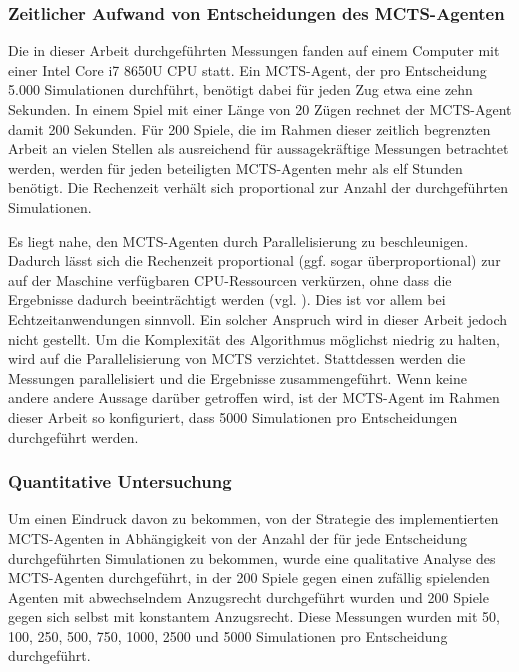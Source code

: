 \subsubsection{Zeitlicher Aufwand von Entscheidungen des MCTS-Agenten}

Die in dieser Arbeit durchgeführten Messungen fanden auf einem Computer mit einer Intel Core i7 8650U CPU statt. Ein MCTS-Agent, der pro Entscheidung 5.000 Simulationen durchführt, benötigt dabei für jeden Zug etwa eine zehn Sekunden. In einem Spiel mit einer Länge von 20 Zügen rechnet der MCTS-Agent damit 200 Sekunden. Für 200 Spiele, die im Rahmen dieser zeitlich begrenzten Arbeit an vielen Stellen als ausreichend für aussagekräftige Messungen betrachtet werden, werden für jeden beteiligten MCTS-Agenten mehr als elf Stunden benötigt. Die Rechenzeit verhält sich proportional zur Anzahl der durchgeführten Simulationen.

Es liegt nahe, den MCTS-Agenten durch Parallelisierung zu beschleunigen. Dadurch lässt sich die Rechenzeit proportional (ggf. sogar überproportional) zur auf der Maschine verfügbaren CPU-Ressourcen verkürzen, ohne dass die Ergebnisse dadurch beeinträchtigt werden (vgl. \cite{Chaslot.2008}). Dies ist vor allem bei Echtzeitanwendungen sinnvoll. Ein solcher Anspruch wird in dieser Arbeit jedoch nicht gestellt. Um die Komplexität des Algorithmus möglichst niedrig zu halten, wird auf die Parallelisierung von MCTS verzichtet. Stattdessen werden die Messungen parallelisiert und die Ergebnisse zusammengeführt. Wenn keine andere andere Aussage darüber getroffen wird, ist der MCTS-Agent im Rahmen dieser Arbeit so konfiguriert, dass 5000 Simulationen pro Entscheidungen durchgeführt werden.

\subsubsection{Quantitative Untersuchung}

Um einen Eindruck davon zu bekommen, von der Strategie des implementierten MCTS-Agenten in Abhängigkeit von der Anzahl der für jede Entscheidung durchgeführten Simulationen zu bekommen, wurde eine qualitative Analyse des MCTS-Agenten durchgeführt, in der 200 Spiele gegen einen zufällig spielenden Agenten mit abwechselndem Anzugsrecht durchgeführt wurden und 200 Spiele gegen sich selbst mit konstantem Anzugsrecht. Diese Messungen wurden mit 50, 100, 250, 500, 750, 1000, 2500 und 5000 Simulationen pro Entscheidung durchgeführt.

